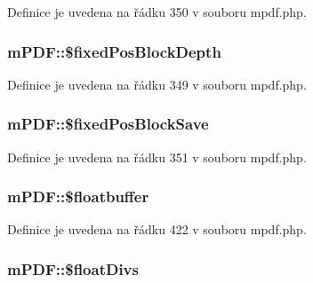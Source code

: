 Definice je uvedena na řádku 350 v souboru mpdf.\-php.

\hypertarget{classm_p_d_f_a438411d6c0f2e36cbda5930590274f64}{
\subsubsection[{\$fixed\-Pos\-Block\-Depth}]{\setlength{\rightskip}{0pt plus 5cm}m\-P\-D\-F\-::\$fixed\-Pos\-Block\-Depth}}\label{classm_p_d_f_a438411d6c0f2e36cbda5930590274f64}


Definice je uvedena na řádku 349 v souboru mpdf.\-php.

\hypertarget{classm_p_d_f_a64fbbded26ff8ab5ab8451d2afd72f70}{
\subsubsection[{\$fixed\-Pos\-Block\-Save}]{\setlength{\rightskip}{0pt plus 5cm}m\-P\-D\-F\-::\$fixed\-Pos\-Block\-Save}}\label{classm_p_d_f_a64fbbded26ff8ab5ab8451d2afd72f70}


Definice je uvedena na řádku 351 v souboru mpdf.\-php.

\hypertarget{classm_p_d_f_a5dc8d83cce11b132790db030106f33ab}{
\subsubsection[{\$floatbuffer}]{\setlength{\rightskip}{0pt plus 5cm}m\-P\-D\-F\-::\$floatbuffer}}\label{classm_p_d_f_a5dc8d83cce11b132790db030106f33ab}


Definice je uvedena na řádku 422 v souboru mpdf.\-php.

\hypertarget{classm_p_d_f_ae99e2e671d82f7c47bf570dcbb865ecc}{
\subsubsection[{\$float\-Divs}]{\setlength{\rightskip}{0pt plus 5cm}m\-P\-D\-F\-::\$float\-Divs}}\label{classm_p_d_f_ae99e2e671d82f7c47bf570dcbb865ecc}


